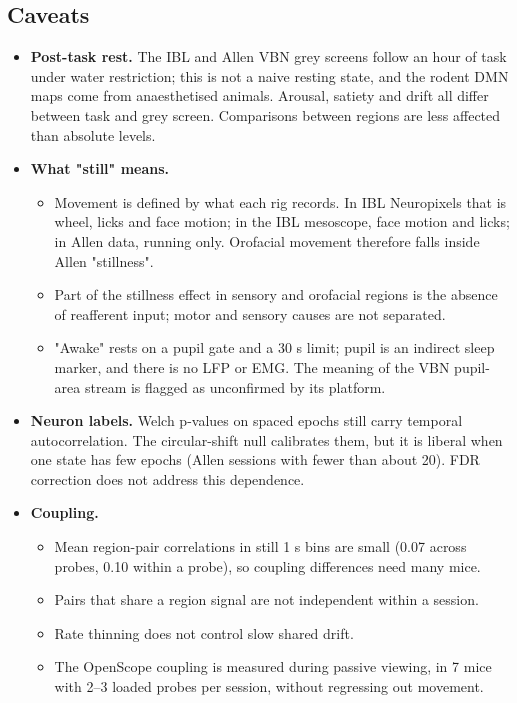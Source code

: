 \documentclass[10pt,a4paper]{article}
\begin{document}
\subsection{Caveats}
\begin{itemize}
\item \textbf{Post-task rest.} The IBL and Allen VBN grey screens follow an hour of task under water restriction; this is not a naive resting state, and the rodent DMN maps come from anaesthetised animals. Arousal, satiety and drift all differ between task and grey screen. Comparisons between regions are less affected than absolute levels.
\item \textbf{What "still" means.} 
\begin{itemize}
\item Movement is defined by what each rig records. In IBL Neuropixels that is wheel, licks and face motion; in the IBL mesoscope, face motion and licks; in Allen data, running only. Orofacial movement therefore falls inside Allen "stillness".
\item Part of the stillness effect in sensory and orofacial regions is the absence of reafferent input; motor and sensory causes are not separated.
\item "Awake" rests on a pupil gate and a 30 s limit; pupil is an indirect sleep marker, and there is no LFP or EMG. The meaning of the VBN pupil-area stream is flagged as unconfirmed by its platform.
\end{itemize}
\item \textbf{Neuron labels.} Welch p-values on spaced epochs still carry temporal autocorrelation. The circular-shift null calibrates them, but it is liberal when one state has few epochs (Allen sessions with fewer than about 20). FDR correction does not address this dependence.
\item \textbf{Coupling.} 
\begin{itemize}
\item Mean region-pair correlations in still 1 s bins are small (0.07 across probes, 0.10 within a probe), so coupling differences need many mice.
\item Pairs that share a region signal are not independent within a session.
\item Rate thinning does not control slow shared drift.
\item The OpenScope coupling is measured during passive viewing, in 7 mice with 2--3 loaded probes per session, without regressing out movement.
\end{itemize}

\end{itemize}
\end{document}
